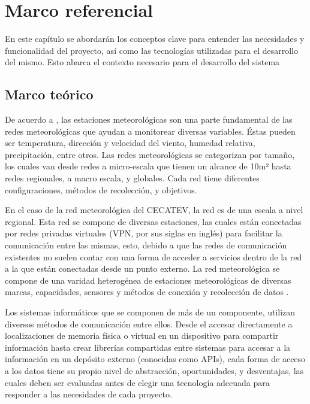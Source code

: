 \chapter{Marco referencial}

En este capítulo se abordarán los conceptos clave para entender las necesidades y funcionalidad del proyecto, así como las tecnologías utilizadas para el desarrollo del mismo. Esto abarca el contexto necesario para el desarrollo del sistema

\section{Marco teórico}

De acuerdo a \cite{muller_sensors_and_the_city}, las estaciones meteorológicas son una parte fundamental de las redes meteorológicas que ayudan a monitorear diversas variables. Éstas pueden ser temperatura, dirección y velocidad del viento, humedad relativa, precipitación, entre otros. Las redes meteorológicas se categorizan por tamaño, los cuales van desde redes a micro-escala que tienen un alcance de 10m² hasta redes regionales, a macro escala, y globales. Cada red tiene diferentes configuraciones, métodos de recolección, y objetivos.

En el caso de la red meteorológica del CECATEV, la red es de una escala a nivel regional. Esta red se compone de diversas estaciones, las cuales están conectadas por redes privadas virtuales (VPN, por sus siglas en inglés) para facilitar la comunicación entre las mismas, esto, debido a que las redes de comunicación existentes no suelen contar con una forma de acceder a servicios dentro de la red a la que están conectadas desde un punto externo. La red meteorológica se compone de una varidad heterogénea de estaciones meteorológicas de diversas marcas, capacidades, sensores y métodos de conexión y recolección de datos \cite{red_climatologica_uacj}.





Los sistemas informáticos que se componen de más de un componente, utilizan diversos métodos de comunicación entre ellos. Desde el accesar directamente a localizaciones de memoria física o virtual en un dispositivo para compartir información hasta crear librerías compartidas entre sistemas para accesar a la información en un depósito externo (conocidas como APIs), cada forma de acceso a los datos tiene su propio nivel de abstracción, oportunidades, y desventajas, las cuales deben ser evaluadas antes de elegir una tecnología adecuada para responder a las necesidades de cada proyecto.

